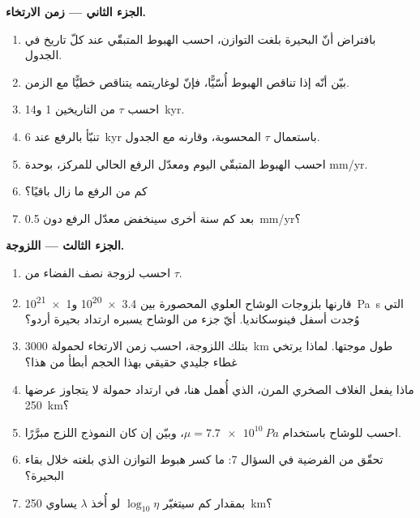 \begin{problem}
\medskip\noindent\textbf{الجزء الثاني --- زمن الارتخاء.}
\begin{enumerate}[resume]
  \item بافتراض أنّ البحيرة بلغت التوازن، احسب الهبوط المتبقّي
        عند كلّ تاريخ في الجدول.
  \item بيّن أنّه إذا تناقص الهبوط أُسّيًّا، فإنّ لوغاريتمه يتناقص
        خطيًّا مع الزمن.
  \item احسب $\tau$ من التاريخين 1 و\qty{14}{kyr}.
  \item تنبّأ بالرفع عند \qty{6}{kyr} باستعمال $\tau$ المحسوبة، وقارنه مع
        الجدول.
  \item احسب الهبوط المتبقّي اليوم ومعدّل الرفع الحالي للمركز،
        بوحدة \unit{mm/yr}.
  \item كم من الرفع ما زال باقيًا؟
  \item بعد كم سنة أخرى سينخفض معدّل الرفع دون
        \qty{0.5}{mm/yr}؟
\end{enumerate}

\medskip\noindent\textbf{الجزء الثالث --- اللزوجة.}
\begin{enumerate}[resume]
  \item احسب لزوجة نصف الفضاء من $\tau$.
  \item قارنها بلزوجات الوشاح العلوي المحصورة بين \num{3.4e20}
        و\qty{1e21}{Pa.s} التي وُجدت أسفل فينوسكانديا.
        أيّ جزء من الوشاح يسبره ارتداد بحيرة أردو؟
  \item بتلك اللزوجة، احسب زمن الارتخاء لحمولة
        \qty{3000}{km} طول موجتها. لماذا يرتخي غطاء جليدي حقيقي بهذا الحجم
        أبطأ من هذا؟
  \item ماذا يفعل الغلاف الصخري المرن، الذي أُهمل هنا، في ارتداد
        حمولة لا يتجاوز عرضها \qty{250}{km}؟
  \item احسب  للوشاح باستخدام $\mu = \qty{7.7e10}{Pa}$،
        وبيّن إن كان النموذج اللزج مبرَّرًا.
  \item تحقّق من الفرضية في السؤال 7: ما كسر هبوط التوازن الذي بلغته
        خلال بقاء البحيرة؟
  \item بمقدار كم سيتغيّر $\log_{10}\eta$ لو أُخذ $\lambda$ يساوي
        \qty{250}{km}؟
\end{enumerate}


\end{problem}
